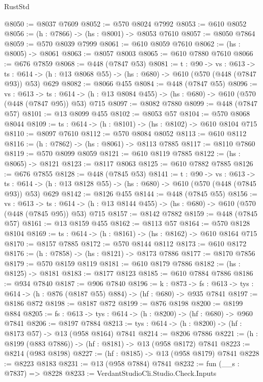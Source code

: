 \begin{lexlean}{RustStd}
\begin{coremodule}
@8050 := @8037 @7609
@8052 := @570 @8024 @7992
@8053 := @610 @8052
@8056 := (h : @7866) -> (hs : @8001) -> @8053 @7610
@8057 := @8050 @7864
@8059 := @570 @8039 @7999
@8061 := @610 @8059 @7610
@8062 := (hs : @8005) -> @8061
@8063 := @8057 @8003
@8065 := @610 @7880 @7610
@8066 := @676 @7859
@8068 := @448 (@7847 @53)
@8081 := {t : @90} ->
  {vs : @613} ->
  {ts : @614} -> (h : @13 @8068 @55) -> (hs : @680) -> @610 (@570 (@448 (@7847 @93)) @53) @629
@8082 := @8066 @455
@8084 := @448 (@7847 @55)
@8096 := {vs : @613} ->
  {ts : @614} -> (h : @13 @8084 @455) -> (hs : @680) -> @610 (@570 (@448 (@7847 @95)) @53) @715
@8097 := @8082 @7880
@8099 := @448 (@7847 @57)
@8101 := @13 @8099 @455
@8102 := @8053 @57
@8104 := @570 @8068 @8044
@8109 := {ts : @614} -> (h : @8101) -> (hs : @8102) -> @610 @8104 @715
@8110 := @8097 @7610
@8112 := @570 @8084 @8052
@8113 := @610 @8112
@8116 := (h : @7862) -> (hs : @8061) -> @8113 @7885
@8117 := @8110 @7860
@8119 := @570 @8099 @8059
@8121 := @610 @8119 @7885
@8122 := (hs : @8065) -> @8121
@8123 := @8117 @8063
@8125 := @610 @7882 @7885
@8126 := @676 @7855
@8128 := @448 (@7845 @53)
@8141 := {t : @90} ->
  {vs : @613} ->
  {ts : @614} -> (h : @13 @8128 @55) -> (hs : @680) -> @610 (@570 (@448 (@7845 @93)) @53) @629
@8142 := @8126 @455
@8144 := @448 (@7845 @55)
@8156 := {vs : @613} ->
  {ts : @614} -> (h : @13 @8144 @455) -> (hs : @680) -> @610 (@570 (@448 (@7845 @95)) @53) @715
@8157 := @8142 @7882
@8159 := @448 (@7845 @57)
@8161 := @13 @8159 @455
@8162 := @8113 @57
@8164 := @570 @8128 @8104
@8169 := {ts : @614} -> (h : @8161) -> (hs : @8162) -> @610 @8164 @715
@8170 := @8157 @7885
@8172 := @570 @8144 @8112
@8173 := @610 @8172
@8176 := (h : @7858) -> (hs : @8121) -> @8173 @7886
@8177 := @8170 @7856
@8179 := @570 @8159 @8119
@8181 := @610 @8179 @7886
@8182 := (hs : @8125) -> @8181
@8183 := @8177 @8123
@8185 := @610 @7884 @7886
@8186 := @934 @7840
@8187 := @906 @7840
@8196 := {k : @873} ->
  {fs : @613} -> {tys : @614} -> (h : @876 (@8187 @55) @884) -> (hf : @680) -> @935 @7841
@8197 := @8186 @872
@8198 := @8187 @872
@8199 := @876 @8198
@8200 := @8199 @884
@8205 := {fs : @613} -> {tys : @614} -> (h : @8200) -> (hf : @680) -> @960 @7841
@8206 := @8197 @7884
@8213 := {tys : @614} -> (h : @8200) -> (hf : @8173 @57) -> @13 (@958 @8164) @7841
@8214 := @8206 @7886
@8221 := (h : @8199 (@883 @7886)) -> (hf : @8181) -> @13 (@958 @8172) @7841
@8223 := @8214 (@983 @8198)
@8227 := (hf : @8185) -> @13 (@958 @8179) @7841
@8228 := @8223 @8183
@8231 := @13 (@958 @7884) @7841
@8232 := fun (__s : @7837) => @8228
@8233 := VerdantStudioCli.Studio.Check.Inputs

\end{coremodule}
\end{lexlean}
